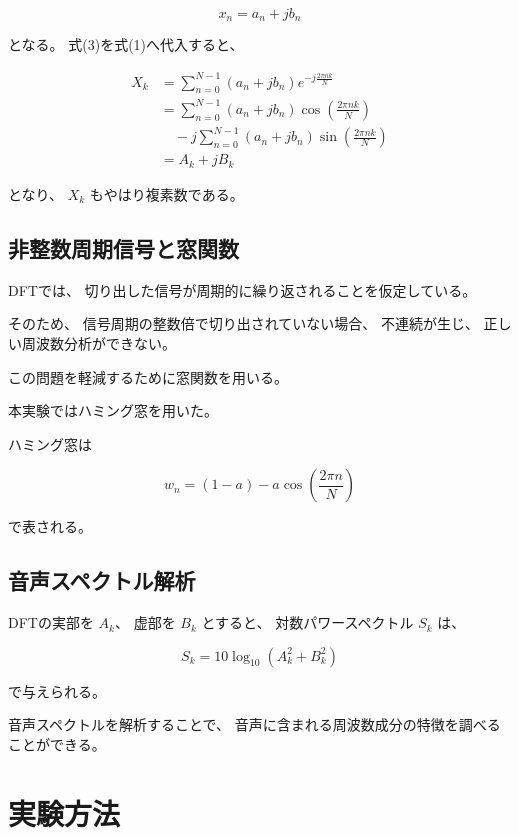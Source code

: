 \documentclass{jsarticle}
\begin{document}
\begin{equation}
x_n=a_n+jb_n
\end{equation}

となる。
式(3)を式(1)へ代入すると、

\begin{align}
X_k
&=
\sum_{n=0}^{N-1}
(a_n+jb_n)
e^{-j\frac{2\pi nk}{N}}
\\
&=
\sum_{n=0}^{N-1}
(a_n+jb_n)
\cos\left(
\frac{2\pi nk}{N}
\right)
\nonumber
\\
&\quad
-j
\sum_{n=0}^{N-1}
(a_n+jb_n)
\sin\left(
\frac{2\pi nk}{N}
\right)
\\
&=
A_k+jB_k
\end{align}

となり、
$X_k$ もやはり複素数である。

\subsection{非整数周期信号と窓関数}

DFTでは、
切り出した信号が周期的に繰り返されることを仮定している。

そのため、
信号周期の整数倍で切り出されていない場合、
不連続が生じ、
正しい周波数分析ができない。

この問題を軽減するために窓関数を用いる。

本実験ではハミング窓を用いた。

ハミング窓は

\begin{equation}
w_n
=
(1-a)-a\cos\left(
\frac{2\pi n}{N}
\right)
\end{equation}

で表される。

\subsection{音声スペクトル解析}

DFTの実部を $A_k$、
虚部を $B_k$ とすると、
対数パワースペクトル $S_k$ は、

\begin{equation}
S_k
=
10\log_{10}
\left(
A_k^2+B_k^2
\right)
\end{equation}

で与えられる。

音声スペクトルを解析することで、
音声に含まれる周波数成分の特徴を調べることができる。

\section{実験方法}
\end{document}
